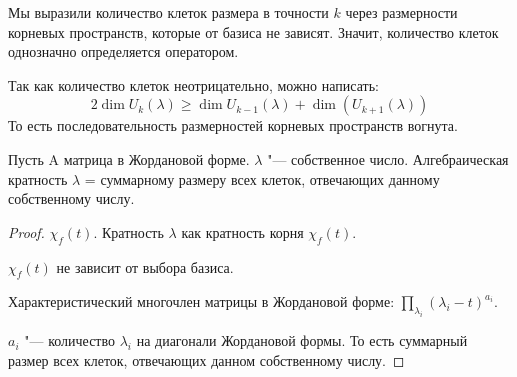 \begin{conseq}
	Мы выразили количество клеток размера в точности $k$ через размерности корневых пространств,
	которые от базиса не зависят.
	Значит, количество клеток однозначно определяется оператором.
\end{conseq}
\begin{conseq}
	Так как количество клеток неотрицательно, можно написать:
	\[ 2\dim U_k(\lambda) \ge \dim U_{k-1}(\lambda) + \dim(U_{k+1}(\lambda)) \]
	То есть последовательность размерностей корневых пространств вогнута.
\end{conseq}
\begin{lemma}{}
Пусть A матрица в Жордановой форме. $\lambda$ "--- собственное число. Алгебраическая кратность 
$\lambda$ = суммарному размеру всех клеток, отвечающих данному собственному числу. 
\end{lemma}
\begin{proof}
$\chi_f(t)$. Кратность $\lambda$ как кратность корня $\chi_f(t)$.

$\chi_f(t)$ не зависит от выбора базиса. 

Характеристический многочлен матрицы в Жордановой форме: $\prod_{\lambda_i}(\lambda_i - t)^{a_i}$.

$a_i$ "--- количество $\lambda_i$ на диагонали Жордановой формы. То есть суммарный размер
всех клеток, отвечающих данном собственному числу.
\end{proof}